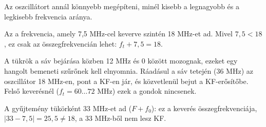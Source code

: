 Az oszcillátort annál könnyebb megépíteni, minél kisebb a legnagyobb és a legkisebb frekvencia aránya.

\begin{center}\end{center}



\begin{center}\end{center}

Az a frekvencia, amely 7,5 MHz-cel keverve szintén 18 MHz-et ad. Mivel $7{,}5<18$, ez csak az összegfrekvencián lehet: $f_t+7{,}5=18$.

\begin{center}\end{center}

A tükrök a sáv bejárása közben 12 MHz és 0 között mozognak, ezeket egy hangolt bemeneti szűrőnek kell elnyomnia. Ráadásul a sáv tetején (36 MHz) az oszcillátor 18 MHz-en, pont a KF-en jár, és közvetlenül bejut a KF-erősítőbe. Felső keverésnél ($f_t=60\ldots72$ MHz) ezek a gondok nincsenek.
\begin{figyelem}[Javítás]
A gyűjtemény tükörként 33 MHz-et ad ($F+f_0$): ez a keverés összegfrekvenciája, $|33-7{,}5|=25{,}5\ne18$, a 33 MHz-ből nem lesz KF.
\end{figyelem}
\begin{eredmeny}

\begin{center}\end{center}
\end{eredmeny}


